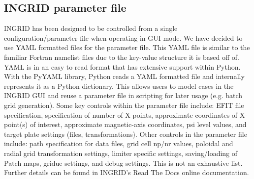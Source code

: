 \subsection{\label{sec:level2}INGRID parameter file}
INGRID has been designed to be controlled from a single
configuration/parameter file when operating in GUI mode. We have
decided to use YAML formatted files for the parameter
file\cite{PyYAML}. This YAML file is similar to the familiar Fortran
namelist files due to the key-value structure it is based off of. YAML
is in an easy to read format that has extensive support within
Python. With the PyYAML library, Python reads a YAML formatted file
and internally represents it as a Python dictionary. This allows users
to model cases in the INGRID GUI and reuse a parameter file in
scripting for later usage (e.g. batch grid generation). Some key
controls within the parameter file include: EFIT file specification,
specification of number of X-points, approximate coordinates of
X-point(s) of interest, approximate magnetic-axis coordinates, psi
level values, and target plate settings (files,
transformations). Other controls in the parameter file include: path
specification for data files, grid cell np/nr values, poloidal and
radial grid transformation settings, limiter specific settings,
saving/loading of Patch maps, gridue settings, and debug
settings. This is not an exhaustive list. Further details can be found
in INGRID's Read The Docs online documentation.
